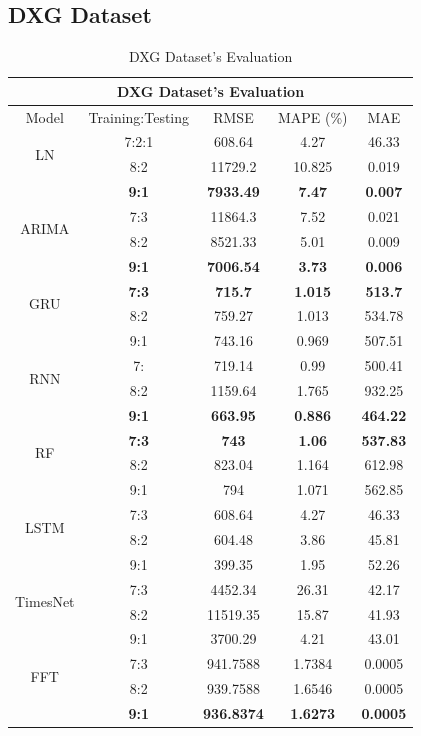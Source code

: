 \documentclass{ieeeojies}
\begin{document}
\subsection{DXG Dataset} 
\begin{table}[H]
  \centering
  \begin{tabular}{|c|c|c|c|c|}
         \hline
         \multicolumn{5}{|c|}{\textbf{DXG Dataset's Evaluation}}\\
         \hline
         \centering Model & Training:Testing & RMSE & MAPE (\%) & MAE\\
         \hline
         \multirow{2}{*}{LN} & 7:2:1 & 608.64 & 4.27 & 46.33 \\ & 8:2 & 11729.2 & 10.825 & 0.019 \\ & \textbf{9:1} & \textbf{7933.49} & \textbf{7.47} & \textbf{0.007}\\
         \hline
         \multirow{2}{*}{ARIMA} & 7:3&11864.3&7.52&0.021\\ & 8:2&8521.33&5.01&0.009 \\ & \textbf{9:1} & \textbf{7006.54} & \textbf{3.73} & \textbf{0.006}\\
         \hline
         \multirow{2}{*}{GRU} & \textbf{7:3}& \textbf{715.7} & \textbf{1.015} & \textbf{513.7} \\ & 8:2 & 759.27 & 1.013 & 534.78  \\ & 9:1 & 743.16	&0.969&507.51\\
         \hline
         \multirow{2}{*}{RNN} & 7: &  719.14 &  0.99 &  500.41 \\ & 8:2 &  1159.64 & 1.765 &  932.25 \\ & \textbf{9:1} & \textbf{663.95} & \textbf{0.886} & \textbf{464.22} \\
         \hline
         \multirow{2}{*}{RF} & \textbf{7:3}	& \textbf{743} & \textbf{1.06} &  \textbf{537.83} \\ & 8:2 & 823.04 & 1.164 & 612.98 \\ & 9:1 & 794 & 1.071 & 562.85\\
         \hline
         \multirow{2}{*}{LSTM} & 7:3 & 608.64 & 4.27 & 46.33 \\ & 8:2 & 604.48 & 3.86 & 45.81 \\ & 9:1 & 399.35	&1.95&52.26\\
         \hline
         \multirow{2}{*}{TimesNet} & 7:3 & 4452.34 & 26.31 & 42.17 \\ & 8:2 & 11519.35 & 15.87 & 41.93 \\ & 9:1 & 3700.29	& 4.21 &43.01\\
         \hline
         \multirow{2}{*}{FFT} & 7:3 & 941.7588 &  1.7384 &  0.0005 \\ & 8:2 & 939.7588 &  1.6546 &  0.0005 \\ & \textbf{9:1} & \textbf{936.8374} & \textbf{1.6273} & \textbf{0.0005}\\
         \hline
    \end{tabular}
    \caption{DXG Dataset's Evaluation}

    \label{vcbresult}
\end{table}
\end{document}

